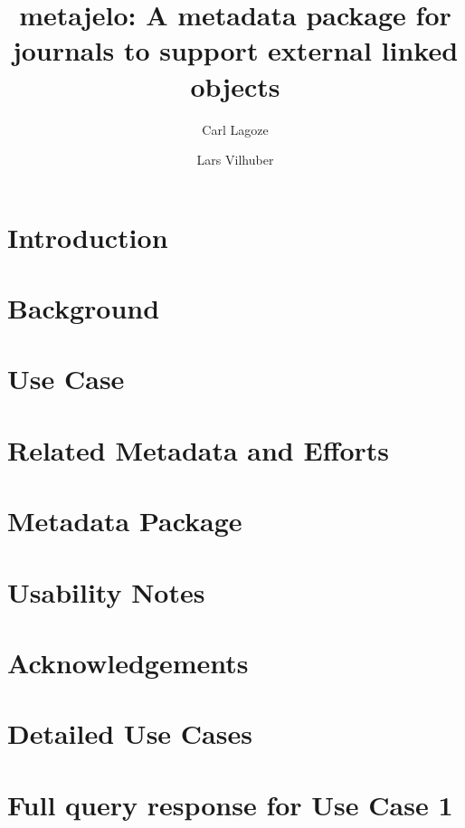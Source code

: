 \documentclass[research,19]{idcc}
\author{Carl Lagoze}
\affil{University of Michigan}
\author{Lars Vilhuber}
\affil{Cornell University}
\title{metajelo: A metadata package for journals to support external linked objects}
\begin{document}
\maketitle

\begin{abstract}
	
\end{abstract}

\section{Introduction}
\label{sec:intro}


\section{Background}
\label{sec:background}


\section{Use Case}
\label{sec:usecase}


\section{Related Metadata and Efforts}
\label{sec:related-metadata}


\section{Metadata Package}
\label{sec:metadata-package}


\section{Usability Notes}
\label{sec:usability}


\section{Acknowledgements}
\label{sec:ack}



%
%
\printbibliography


\appendix

\section{Detailed Use Cases}
\label{app:cases}
\newcommand{\suppDir}{supplementary_masterials}


\section{Full query response for Use Case 1}

\end{document}

